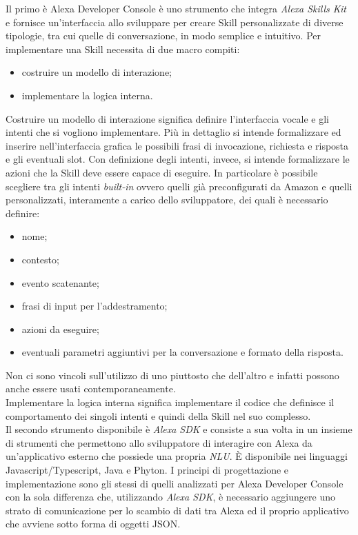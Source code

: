 		Il primo è Alexa Developer Console è uno strumento che integra \textit{Alexa Skills Kit} e fornisce un'interfaccia allo sviluppare per creare Skill personalizzate di diverse tipologie, tra cui quelle di conversazione, in modo semplice e intuitivo.
		Per implementare una Skill necessita di due macro compiti:
		\begin{itemize}
			\item costruire un modello di interazione;
			\item implementare la logica interna.
		\end{itemize}
		Costruire un modello di interazione significa definire l'interfaccia vocale e gli intenti che si vogliono implementare. Più in dettaglio si intende formalizzare ed inserire nell'interfaccia grafica le possibili frasi di invocazione, richiesta e risposta e gli eventuali slot. Con definizione degli intenti, invece, si intende formalizzare le azioni che la Skill deve essere capace di eseguire. In particolare è possibile scegliere tra gli intenti \textit{built-in} ovvero quelli già preconfigurati da Amazon e quelli personalizzati, interamente a carico dello sviluppatore, dei quali è necessario definire:
		\begin{itemize}
			\item nome;
			\item contesto;
			\item evento scatenante;
			\item frasi di input per l'addestramento;
			\item azioni da eseguire;
			\item eventuali parametri aggiuntivi per la conversazione e formato della risposta.
		\end{itemize}
		Non ci sono vincoli sull'utilizzo di uno piuttosto che dell'altro e infatti possono anche essere usati contemporaneamente. \\
		Implementare la logica interna significa implementare il codice che definisce il comportamento dei singoli intenti e quindi della Skill nel suo complesso. \\
		Il secondo strumento disponibile è \textit{Alexa SDK} e consiste a sua volta in un insieme di strumenti che permettono allo sviluppatore di interagire con Alexa da un'applicativo esterno che possiede una propria \textit{NLU}. È disponibile nei linguaggi Javascript/Typescript, Java e Phyton. I principi di progettazione e implementazione sono gli stessi di quelli analizzati per Alexa Developer Console con la sola differenza che, utilizzando \textit{Alexa SDK}, è necessario aggiungere uno strato di comunicazione per lo scambio di dati tra Alexa ed il proprio applicativo che avviene sotto forma di oggetti JSON.
